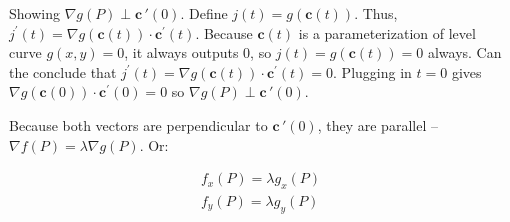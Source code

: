 Showing $\nabla g(P)\perp \textbf{c}\,'(0)$. Define $j(t)=g(\textbf{c}(t))$. Thus, $j^{\prime}(t)=\nabla g(\textbf{c}(t)) \cdot \textbf{c}^{\prime}(t)$.
Because $\textbf{c}(t)$ is a parameterization of level curve $g(x,y)=0$, it always outputs 0, so $j(t)=g(\textbf{c}(t))=0$ always. Can the conclude that
$j^{\prime}(t)=\nabla g(\textbf{c}(t)) \cdot \textbf{c}^{\prime}(t)=0$. Plugging in $t=0$ gives $\nabla g(\textbf{c}(0)) \cdot \textbf{c}^{\prime}(0)=0$ so $\nabla g(P)\perp \textbf{c}\,'(0)$.

Because both vectors are perpendicular to $\textbf{c}\,'(0)$, they are parallel -- $\nabla f(P)=\lambda \nabla g(P)$. Or:

$$\begin{array}{l}
    f_{x}(P)=\lambda g_{x}(P) \\
    f_{y}(P)=\lambda g_{y}(P)
\end{array}$$